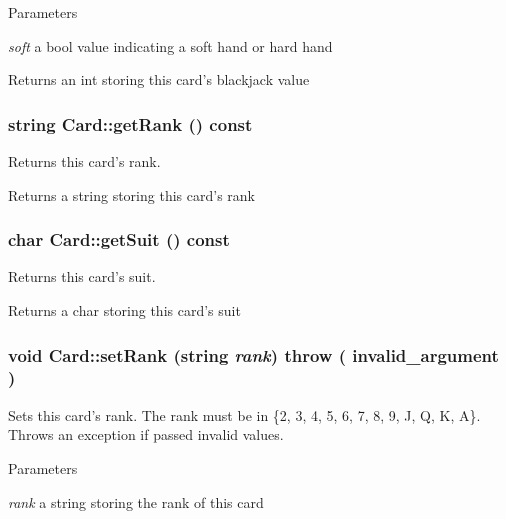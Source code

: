 \begin{DoxyParams}{Parameters}
\item[{\em soft}]a bool value indicating a soft hand or hard hand \end{DoxyParams}
\begin{DoxyReturn}{Returns}
an int storing this card's blackjack value 
\end{DoxyReturn}
\hypertarget{classCard_a8de9d0cc458fd3fc041e634de1e3fe02}{
\subsubsection[{getRank}]{\setlength{\rightskip}{0pt plus 5cm}string Card::getRank () const}}
\label{classCard_a8de9d0cc458fd3fc041e634de1e3fe02}
Returns this card's rank.

\begin{DoxyReturn}{Returns}
a string storing this card's rank 
\end{DoxyReturn}
\hypertarget{classCard_a68cd406e737e3fa394793b32cf340dfc}{
\subsubsection[{getSuit}]{\setlength{\rightskip}{0pt plus 5cm}char Card::getSuit () const}}
\label{classCard_a68cd406e737e3fa394793b32cf340dfc}
Returns this card's suit.

\begin{DoxyReturn}{Returns}
a char storing this card's suit 
\end{DoxyReturn}
\hypertarget{classCard_aa5154e5b8eff5c531ec9e67eefe73576}{
\subsubsection[{setRank}]{\setlength{\rightskip}{0pt plus 5cm}void Card::setRank (string {\em rank})  throw ( invalid\_\-argument )}}
\label{classCard_aa5154e5b8eff5c531ec9e67eefe73576}
Sets this card's rank. The rank must be in \{2, 3, 4, 5, 6, 7, 8, 9, J, Q, K, A\}. Throws an exception if passed invalid values.


\begin{DoxyParams}{Parameters}
\item[{\em rank}]a string storing the rank of this card \end{DoxyParams}

